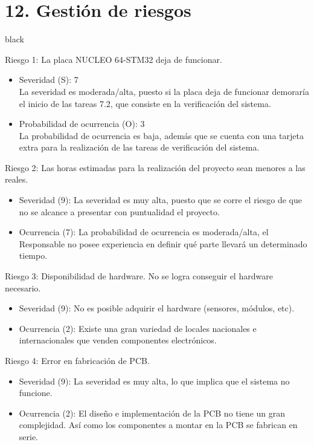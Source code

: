 \documentclass[11pt]{charter}
\begin{document}
\section{12. Gestión de riesgos}
\label{sec:riesgos}
\vspace{-30px}
\begin{consigna}{black}
 
Riesgo 1: La placa NUCLEO 64-STM32 deja de funcionar.
\begin{itemize}
\item Severidad (S): 7\\
La severidad es moderada/alta, puesto si la placa deja de funcionar demoraría el inicio de las tareas 7.2, que consiste en la verificación del sistema.
\item Probabilidad de ocurrencia (O): 3\\
La probabilidad de ocurrencia es baja, además que se cuenta con una tarjeta extra para la realización de las tareas de verificación del sistema. 
\end{itemize}   

Riesgo 2: Las horas estimadas para la realización del proyecto sean menores a las reales.
\begin{itemize}
\item Severidad (9): La severidad es muy alta, puesto que se corre el riesgo de que no se alcance a presentar con puntualidad el proyecto. 
\item Ocurrencia (7): La probabilidad de ocurrencia es moderada/alta, el Responsable no posee experiencia en definir qué parte llevará un determinado tiempo. 
\end{itemize}

Riesgo 3: Disponibilidad de hardware. No se logra conseguir el hardware necesario.
\begin{itemize}
\item Severidad (9): No es posible adquirir el hardware (sensores, módulos, etc).
\item Ocurrencia (2): Existe una gran variedad de locales nacionales e internacionales que venden componentes electrónicos.
\end{itemize}

Riesgo 4: Error en fabricación de PCB. 
\begin{itemize}
\item Severidad (9): La severidad es muy alta, lo que implica que el sistema no funcione.
\item Ocurrencia (2): El diseño e implementación de la PCB no tiene un gran complejidad. Así como los componentes a montar en la PCB se fabrican en serie.
\end{itemize}


\end{consigna}
\end{document}
